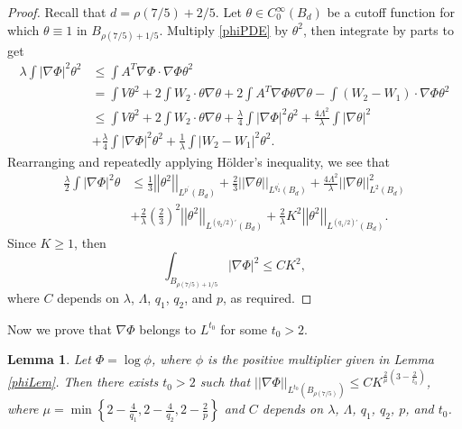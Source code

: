 \documentclass[12pt,reqno]{amsart}
\theoremstyle{plain}
\newtheorem{lem}{Lemma}
\theoremstyle{definition}
\newcommand{\te}{\theta}
\newcommand{\la}{\lambda}
\newcommand{\La}{\Lambda}
\newcommand{\iny}{\infty}
\newcommand{\gr}{\nabla}
\newcommand{\norm}[1]{\left\vert \left\vert #1\right\vert\right\vert}
\newcommand{\abs}[1]{\left\vert#1\right\vert}
\newcommand{\set}[1]{\left\{#1\right\}}
\newcommand{\pr}[1]{\left( #1 \right) }
\begin{document}
\begin{proof}
Recall that $d = \rho\pr{7/5}+2/5$.
Let $\te \in C^\iny_0\pr{B_d}$ be a cutoff function for which $\te \equiv 1$ in $B_{\rho\pr{7/5}+1/5}$.
Multiply \eqref{phiPDE} by $\te^2$, then integrate by parts to get
\begin{align*}
\la \int \abs{\gr \Phi}^2 \te^2 
&\le \int A^T \gr \Phi \cdot \gr \Phi \te^2 \\
&= \int  V \te^2 + 2 \int W_2 \cdot \te \gr \te + 2 \int A^T \gr \Phi  \te \gr \te - \int \pr{W_2 - W_1} \cdot \gr \Phi \te^2 \\
&\le \int  V \te^2 + 2 \int W_2 \cdot \te\gr \te + \frac \la 4 \int \abs{\gr \Phi}^2 \te^2 + \frac{4 \La^2}{\la} \int  \abs{\gr\te}^2 \\
&+ \frac \la 4 \int \abs{\gr \Phi}^2 \te^2 + \frac{1}{\la} \int \abs{W_2 - W_1}^2 \te^2.
\end{align*}
Rearranging and repeatedly applying H\"older's inequality, we see that
\begin{align*}
\frac \la 2 \int \abs{\gr \Phi}^2 \te 
&\le \frac 1 3 \norm{\te^2}_{L^{p^\prime}\pr{B_d}} + \frac 2 3 \norm{\gr \te}_{L^{q_2^\prime}\pr{B_d}} + \frac{4 \La^2}{\la} \norm{\gr \te}_{L^{2}\pr{B_d}}^2 \\
&+ \frac{2}{\la} \pr{\frac 2 3}^2 \norm{\te^2}_{L^{(q_2/2)'}\pr{B_d}}+ \frac{2}{\la} K^2 \norm{\te^2}_{L^{(q_1/2)'}\pr{B_d}}.
\end{align*}
Since $K \ge 1$, then
$$\int_{B_{\rho\pr{7/5}+1/5}} \abs{\gr \Phi}^2 \le C K^2,$$
where $C$ depends on $\la$, $\La$, $q_1$, $q_2$, and $p$, as required.
\end{proof}

Now we prove that $\gr \Phi$ belongs to $L^{t_0}$ for some $t_0 > 2$.

\begin{lem}
Let $\Phi = \log \phi$, where $\phi$ is the positive multiplier given in Lemma \ref{phiLem}.
Then there exists $t_0 > 2$ such that $\norm{\gr \Phi}_{L^{t_0}\pr{B_{\rho\pr{7/5}}}} \le C K^{\frac 2 \mu\pr{3 - \frac 2 {t_0}}}$, where $\mu = \min\set{2 - \frac 4 {q_1}, 2 - \frac 4 {q_2},2 - \frac 2 p}$ and $C$ depends on $\la$, $\La$, $q_1$, $q_2$, $p$, and $t_0$.
\label{grPhiLt0}
\end{lem}
\end{document}
